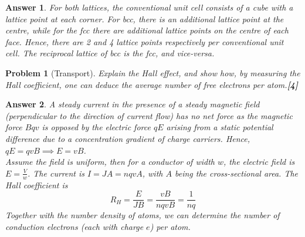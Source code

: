 \documentclass[a4paper]{article}
\newtheorem{ans}{Answer}[subsection]
\theoremstyle{new}
\newtheorem{qns}{Problem}[subsection]
\begin{document}
\begin{ans}
For both lattices, the conventional unit cell consists of a cube with a lattice point at each corner. For bcc, there is an additional lattice point at the centre, while for the fcc there are additional lattice points on the centre of each face. Hence, there are 2 and 4 lattice points respectively per conventional unit cell. The reciprocal lattice of bcc is the fcc, and vice-versa.
\end{ans}
\begin{qns}[Transport]
Explain the Hall effect, and show how, by measuring the Hall coefficient, one can deduce the average number of free electrons per atom.\hfill\textbf{[4]}
\end{qns}
\begin{ans}
A steady current in the presence of a steady magnetic field (perpendicular to the direction of current flow) has no net force as the magnetic force $Bqv$ is opposed by the electric force $qE$ arising from a static potential difference due to a concentration gradient of charge carriers. Hence, $qE=qvB\implies E=vB$.\\[5pt]
Assume the field is uniform, then for a conductor of width $w$, the electric field is $E=\frac{V}{w}$. The current is $I=JA=nqvA$, with $A$ being the cross-sectional area. The Hall coefficient is
$$R_H=\frac{E}{JB}=\frac{vB}{nqvB}=\frac{1}{nq}$$
Together with the number density of atoms, we can determine the number of conduction electrons (each with charge $e$) per atom.
\end{ans}
\newpage
\end{document}
